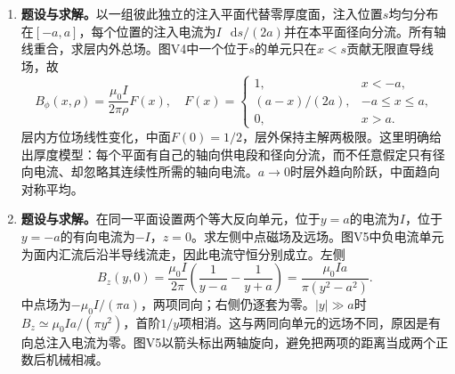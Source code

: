 \documentclass[UTF8,fontset=fandol,a4paper,11pt]{ctexart}
\newcommand{\dd}{\mathop{}\!\mathrm{d}}
\newcommand{\figcaption}[1]{\par\vspace{2pt}{\small\color{muted}#1}\par}
\begin{document}
\begin{enumerate}
\item \textbf{题设与求解。}以一组彼此独立的注入平面代替零厚度面，注入位置$s$均匀分布在$[-a,a]$，每个位置的注入电流为$I\,\dd s/(2a)$并在本平面径向分流。所有轴线重合，求层内外总场。图V4中一个位于$s$的单元只在$x<s$贡献无限直导线场，故
\[B_\phi(x,\rho)=\frac{\mu_0I}{2\pi\rho}F(x),\quad
F(x)=\begin{cases}1,&x<-a,\\(a-x)/(2a),&-a\le x\le a,\\0,&x>a.\end{cases}\]
层内方位场线性变化，中面$F(0)=1/2$，层外保持主解两极限。这里明确给出厚度模型：每个平面有自己的轴向供电段和径向分流，而不任意假定只有径向电流、却忽略其连续性所需的轴向电流。$a\to0$时层外趋向阶跃，中面趋向对称平均。
\begin{center}\begin{minipage}{.98\linewidth}\centering
{}
\figcaption{变图电试1.2V4}
\end{minipage}\end{center}

\item \textbf{题设与求解。}在同一平面设置两个等大反向单元，位于$y=a$的电流为$I$，位于$y=-a$的有向电流为$-I$，$z=0$。求左侧中点磁场及远场。图V5中负电流单元为面内汇流后沿半导线流走，因此电流守恒分别成立。左侧
\[B_z(y,0)=\frac{\mu_0I}{2\pi}\left(\frac1{y-a}-\frac1{y+a}\right)
=\frac{\mu_0I a}{\pi(y^2-a^2)}.\]
中点场为$-\mu_0I/(\pi a)$，两项同向；右侧仍逐套为零。$|y|\gg a$时$B_z\simeq\mu_0I a/(\pi y^2)$，首阶$1/y$项相消。这与两同向单元的远场不同，原因是有向总注入电流为零。图V5以箭头标出两轴旋向，避免把两项的距离当成两个正数后机械相减。
\begin{center}\begin{minipage}{.98\linewidth}\centering
{}
\figcaption{变图电试1.2V5}
\end{minipage}\end{center}


\end{enumerate}
\end{document}
